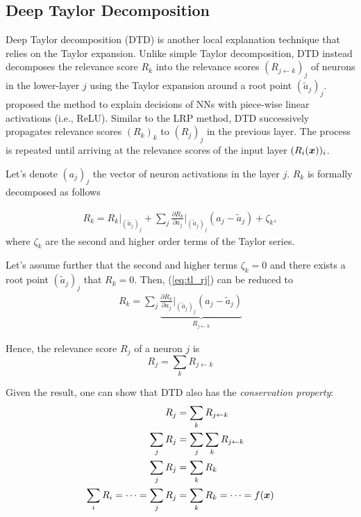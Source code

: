 \subsection{Deep Taylor Decomposition}


Deep Taylor decomposition (DTD) is another local explanation technique that relies on the Taylor expansion. Unlike simple Taylor decomposition, DTD instead decomposes the relevance score $R_k$ into the relevance scores $(R_{j \leftarrow k})_j$ of neurons in the lower-layer $j$ using the Taylor expansion around a root point $(\tilde{a}_j)_j$. \cite{MontavonExplainingnonlinearclassification2017} proposed the method to explain decisions of NNs with piece-wise linear activations (i.e., ReLU). Similar to the LRP method, DTD successively propagates relevance scores  $(R_k)_k$ to $(R_j)_j$ in the previous layer. The process is repeated until arriving at the relevance scores of the input layer $(R_i(\boldsymbol{x}))_i$.

 Let's denote $(a_j)_j$ the vector of neuron activations in the layer $j$. $R_k$ is formally decomposed as follows




 \begin{align} \label{eq:tl_rj}
 R_k = R_k \bigg|_{ (\tilde{a}_j)_j } + \sum_{ j } 	\frac{\partial  R_k }{ \partial a_j } \bigg|_{ (\tilde{a}_j)_j } ( a_j - \tilde{a}_j ) + \zeta_k,
 \end{align}
 where $\zeta_k$ are the second and higher order terms of the Taylor series.

Let's assume further that the second and higher terms $\zeta_k = 0 $ and there exists a root point $(\tilde{a}_j)_j$ that $R_k = 0$. Then, (\ref{eq:tl_rj}) can be reduced to
\begin{align*}
 R_k = \sum_{ j } \underbrace{	\frac{\partial  R_k }{ \partial a_j } \bigg|_{ (\tilde{a}_j)_j }  ( a_j - \tilde{a}_j ) }_{ R_{j \leftarrow k } }
\end{align*}

Hence, the relevance score $R_j$ of a neuron $j$ is 
$$ R_j = \sum_{k} R_{j\leftarrow k}$$

Given the result, one can show that DTD also has the  \textit{conservation property}:
\begin{align} 
	R_j &= \sum_{k} R_{j\leftarrow k} \nonumber \\
\sum_{j}	R_j &= \sum_{j} \sum_{k} R_{j\leftarrow k} \nonumber\\
\sum_{j}	R_j &= \sum_{k}  R_{k} \nonumber \\
\sum_i 	R_{i} = 	\dots = \sum_j R_{j} &= \sum_k R_{k} = \dots =  f(\patvector{x}) \nonumber
\end{align}

